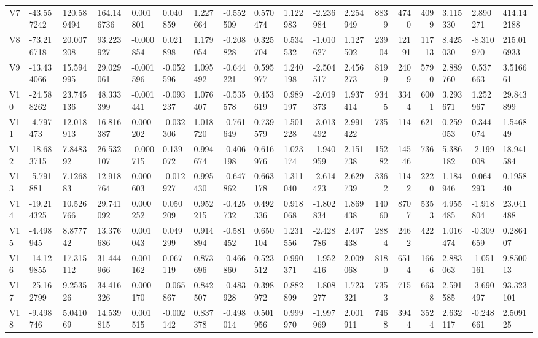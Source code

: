 \begin{longtable}{llllllllllllrrrlll}
V7 & -43.557242 & 120.589494 & 164.146736 & 0.001801 & 0.040859 & 1.227664 & -0.552509 & 0.570474 & 1.122983 & -2.236984 & 2.254949 & 8839 & 4740 & 4099 & 3.115330 & 2.890271 & 414.142188 \\
V8 & -73.216718 & 20.007208 & 93.223927 & -0.000854 & 0.021898 & 1.179054 & -0.208828 & 0.325704 & 0.534532 & -1.010627 & 1.127502 & 23904 & 12191 & 11713 & 8.425030 & -8.310970 & 215.016933 \\
V9 & -13.434066 & 15.594995 & 29.029061 & -0.001596 & -0.052596 & 1.095492 & -0.644221 & 0.595977 & 1.240198 & -2.504517 & 2.456273 & 8199 & 2409 & 5790 & 2.889760 & 0.537663 & 3.516661 \\
V10 & -24.588262 & 23.745136 & 48.333399 & -0.001441 & -0.093237 & 1.076407 & -0.535578 & 0.453619 & 0.989197 & -2.019373 & 1.937414 & 9345 & 3344 & 6001 & 3.293671 & 1.252967 & 29.843899 \\
V11 & -4.797473 & 12.018913 & 16.816387 & 0.000202 & -0.032306 & 1.018720 & -0.761649 & 0.739579 & 1.501228 & -3.013492 & 2.991422 & 735 & 114 & 621 & 0.259053 & 0.344074 & 1.546849 \\
V12 & -18.683715 & 7.848392 & 26.532107 & -0.000715 & 0.139072 & 0.994674 & -0.406198 & 0.616976 & 1.023174 & -1.940959 & 2.151738 & 15282 & 14546 & 736 & 5.386182 & -2.199008 & 18.941584 \\
V13 & -5.791881 & 7.126883 & 12.918764 & 0.000603 & -0.012927 & 0.995430 & -0.647862 & 0.663178 & 1.311040 & -2.614423 & 2.629739 & 3362 & 1142 & 2220 & 1.184946 & 0.064293 & 0.195840 \\
V14 & -19.214325 & 10.526766 & 29.741092 & 0.000252 & 0.050209 & 0.952215 & -0.425732 & 0.492336 & 0.918068 & -1.802834 & 1.869438 & 14060 & 8707 & 5353 & 4.955485 & -1.918804 & 23.041488 \\
V15 & -4.498945 & 8.877742 & 13.376686 & 0.001043 & 0.049299 & 0.914894 & -0.581452 & 0.650104 & 1.231556 & -2.428786 & 2.497438 & 2884 & 2462 & 422 & 1.016474 & -0.309659 & 0.286407 \\
V16 & -14.129855 & 17.315112 & 31.444966 & 0.001162 & 0.067119 & 0.873696 & -0.466860 & 0.523512 & 0.990371 & -1.952416 & 2.009068 & 8180 & 6514 & 1666 & 2.883063 & -1.051161 & 9.850013 \\
V17 & -25.162799 & 9.253526 & 34.416326 & 0.000170 & -0.065867 & 0.842507 & -0.483928 & 0.398972 & 0.882899 & -1.808277 & 1.723321 & 7353 & 715 & 6638 & 2.591585 & -3.690497 & 93.323101 \\
V18 & -9.498746 & 5.041069 & 14.539815 & 0.001515 & -0.002142 & 0.837378 & -0.498014 & 0.501956 & 0.999970 & -1.997969 & 2.001911 & 7468 & 3944 & 3524 & 2.632117 & -0.248661 & 2.509125 \\

\end{longtable}
